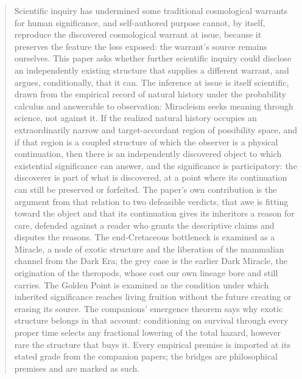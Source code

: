 \maketitle

\begin{abstract}
Scientific inquiry has undermined some traditional cosmological warrants for human significance, and self-authored purpose cannot, by itself, reproduce the discovered cosmological warrant at issue, because it preserves the feature the loss exposed: the warrant's source remains ourselves. This paper asks whether further scientific inquiry could disclose an independently existing structure that supplies a different warrant, and argues, conditionally, that it can. The inference at issue is itself scientific, drawn from the empirical record of natural history under the probability calculus and answerable to observation: Miracleism seeks meaning through science, not against it. If the realized natural history occupies an extraordinarily narrow and target-accordant region of possibility space, and if that region is a coupled structure of which the observer is a physical continuation, then there is an independently discovered object to which existential significance can answer, and the significance is participatory: the discoverer is part of what is discovered, at a point where its continuation can still be preserved or forfeited. The paper's own contribution is the argument from that relation to two defeasible verdicts, that awe is fitting toward the object and that its continuation gives its inheritors a reason for care, defended against a reader who grants the descriptive claims and disputes the reasons. The end-Cretaceous bottleneck is examined as a Miracle, a node of exotic structure and the liberation of the mammalian channel from the Dark Era; the grey case is the earlier Dark Miracle, the origination of the theropods, whose cost our own lineage bore and still carries. The Golden Point is examined as the condition under which inherited significance reaches living fruition without the future creating or erasing its source. The companions' emergence theorem says why exotic structure belongs in that account: conditioning on survival through every proper time selects any fractional lowering of the total hazard, however rare the structure that buys it. Every empirical premise is imported at its stated grade from the companion papers; the bridges are philosophical premises and are marked as such.

\end{abstract}
